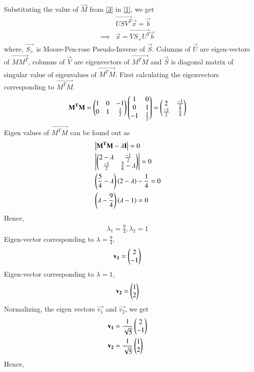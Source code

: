 \documentclass[journal,12pt,twocolumn]{IEEEtran}
\begin{document}
Substituting the value of $\vec{M}$ from \eqref{3} in \eqref{1}, we get
\begin{align}
	&\vec{USV^T}\vec{x} = \vec{b} \\
\implies& \vec{x} = \vec{VS_+U^T}\vec{b}\label{4}
\end{align}
where, $\vec{S_+}$ is Moore-Pen-rose Pseudo-Inverse of $\vec{S}$. Columns of $\vec{U}$ are eigen-vectors of $\vec{MM^T}$, columns of $\vec{V}$ are eigenvectors of $\vec{M^TM}$ and $\vec{S}$ is diagonal matrix of singular value of eigenvalues of $\vec{M^TM}$. First calculating the eigenvectors corresponding to $\vec{M^TM}$.
\begin{align}
\mathbf{M^TM} = \begin{pmatrix}1 & 0 & -1 \\ 0 & 1 & \frac{1}{2} \end{pmatrix} \begin{pmatrix}1 & 0 \\ 0 & 1 \\ -1 & \frac{1}{2}\end{pmatrix} = \begin{pmatrix}2 & \frac{-1}{2} \\ \frac{-1}{2} & \frac{5}{4}\end{pmatrix}
\end{align}
Eigen values of $\vec{M^TM}$ can be found out as
\begin{align}
	& \left\vert\mathbf{M^TM-\lambda I}\right\vert = 0 \\
	& \left\vert\begin{pmatrix}2-\lambda & \frac{-1}{2} \\ \frac{-1}{2} & \frac{5}{4} -\lambda\end{pmatrix}\right\vert = 0 \\
	& \left(\frac{5}{4}-\lambda\right)\left(2-\lambda\right) - \frac{1}{4} = 0 \\
	& \left(\lambda-\frac{9}{4}\right)\left(\lambda-1\right) = 0 
\end{align}
Hence,
\begin{align}
\lambda_1 = \frac{9}{4}, \lambda_2 = 1
\end{align}
Eigen-vector corresponding to $\lambda=\frac{9}{4}$,
\begin{align}
\mathbf{v_1} = \begin{pmatrix}2 \\ -1\end{pmatrix} 
\end{align}
Eigen-vector corresponding to $\lambda = 1$,
\begin{align}
\mathbf{v_2} = \begin{pmatrix}1 \\ 2\end{pmatrix}
\end{align}
Normalizing, the eigen vectors $\vec{v_1}$ and $\vec{v_2}$, we get
\begin{align}
& \mathbf{v_1} = \frac{1}{\sqrt{5}}\begin{pmatrix}2 \\ -1\end{pmatrix} \\
& \mathbf{v_2} = \frac{1}{\sqrt{5}}\begin{pmatrix}1 \\ 2\end{pmatrix} 
\end{align}
Hence,
\end{document}
